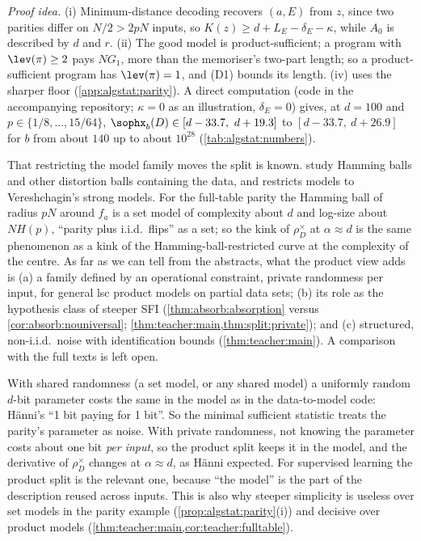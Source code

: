 \emph{Proof idea.} (i) Minimum-distance decoding recovers $(a,E)$ from $z$, since two parities differ on $N/2>2pN$ inputs, so $K(z)\ge d+L_E-\delta_E-\kappa$, while $A_0$ is described by $d$ and $r$. (ii) The good model is product-sufficient; a program with $\lev(\pi)\ge2$ pays $NG_1$, more than the memoriser's two-part length; so a product-sufficient program has $\lev(\pi)=1$, and (D1) bounds its length. (iv) uses the sharper floor (\cref{app:algstat:parity}). A direct computation (code in the accompanying repository; $\kappa=0$ as an illustration, $\delta_E=0$) gives, at $d=100$ and $p\in\{1/8,\dots,15/64\}$, $\sophx_b(D)\in[d-33.7,\ d+19.3]$ to $[d-33.7,\ d+26.9]$ for $b$ from about $140$ up to about $10^{28}$ (\cref{tab:algstat:numbers}).

\begin{remark}\label{rem:algstat:restricted}
That restricting the model family moves the split is known. \citet{vereshchagin2010rate} study Hamming balls and other distortion balls containing the data, and \citet{milovanov2016algorithmic} restricts models to Vereshchagin's strong models. For the full-table parity the Hamming ball of radius $pN$ around $f_a$ is a set model of complexity about $d$ and log-size about $NH(p)$, ``parity plus i.i.d.\ flips'' as a set; so the kink of $\rho^\times_D$ at $\alpha\approx d$ is the same phenomenon as a kink of the Hamming-ball-restricted curve at the complexity of the centre. As far as we can tell from the abstracts, what the product view adds is (a) a family defined by an operational constraint, private randomness per input, for general lsc product models on partial data sets; (b) its role as the hypothesis class of steeper SFI (\cref{thm:absorb:absorption} versus \cref{cor:absorb:nouniversal}; \cref{thm:teacher:main,thm:split:private}); and (c) structured, non-i.i.d.\ noise with identification bounds (\cref{thm:teacher:main}). A comparison with the full texts is left open.
\end{remark}

\begin{remark}\label{rem:algstat:reading}
With shared randomness (a set model, or any shared model) a uniformly random $d$-bit parameter costs the same in the model as in the data-to-model code: H\"anni's ``1 bit paying for 1 bit''. So the minimal sufficient statistic treats the parity's parameter as noise. With private randomness, not knowing the parameter costs about one bit \emph{per input}, so the product split keeps it in the model, and the derivative of $\rho^\times_D$ changes at $\alpha\approx d$, as H\"anni expected. For supervised learning the product split is the relevant one, because ``the model'' is the part of the description reused across inputs. This is also why steeper simplicity is useless over set models in the parity example (\cref{prop:algstat:parity}(i)) and decisive over product models (\cref{thm:teacher:main,cor:teacher:fulltable}).
\end{remark}
